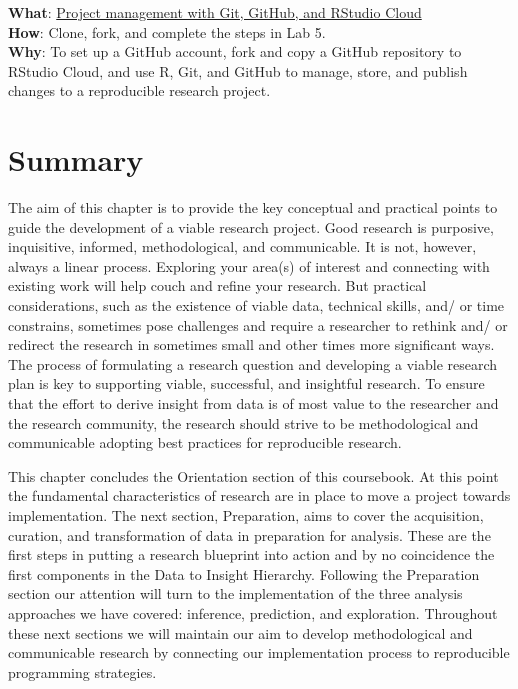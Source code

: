 \documentclass[
  letterpaper,
]{latex/krantz}
\begin{document}
\begin{tcolorbox}[enhanced jigsaw, opacitybacktitle=0.6, breakable, colframe=quarto-callout-tip-color-frame, arc=.35mm, left=2mm, leftrule=.75mm, title=\textcolor{quarto-callout-tip-color}{\faLightbulb}\hspace{0.5em}{Lab}, opacityback=0, colback=white, toptitle=1mm, rightrule=.15mm, titlerule=0mm, bottomtitle=1mm, bottomrule=.15mm, coltitle=black, colbacktitle=quarto-callout-tip-color!10!white, toprule=.15mm]
\textbf{What}: \href{https://github.com/lin380/lab_5}{Project management
with Git, GitHub, and RStudio Cloud}\\
\textbf{How}: Clone, fork, and complete the steps in Lab 5.\\
\textbf{Why}: To set up a GitHub account, fork and copy a GitHub
repository to RStudio Cloud, and use R, Git, and GitHub to manage,
store, and publish changes to a reproducible research project.
\end{tcolorbox}

\hypertarget{summary-4}{%
\section*{Summary}\label{summary-4}}

The aim of this chapter is to provide the key conceptual and practical
points to guide the development of a viable research project. Good
research is purposive, inquisitive, informed, methodological, and
communicable. It is not, however, always a linear process. Exploring
your area(s) of interest and connecting with existing work will help
couch and refine your research. But practical considerations, such as
the existence of viable data, technical skills, and/ or time constrains,
sometimes pose challenges and require a researcher to rethink and/ or
redirect the research in sometimes small and other times more
significant ways. The process of formulating a research question and
developing a viable research plan is key to supporting viable,
successful, and insightful research. To ensure that the effort to derive
insight from data is of most value to the researcher and the research
community, the research should strive to be methodological and
communicable adopting best practices for reproducible research.

This chapter concludes the Orientation section of this coursebook. At
this point the fundamental characteristics of research are in place to
move a project towards implementation. The next section, Preparation,
aims to cover the acquisition, curation, and transformation of data in
preparation for analysis. These are the first steps in putting a
research blueprint into action and by no coincidence the first
components in the Data to Insight Hierarchy. Following the Preparation
section our attention will turn to the implementation of the three
analysis approaches we have covered: inference, prediction, and
exploration. Throughout these next sections we will maintain our aim to
develop methodological and communicable research by connecting our
implementation process to reproducible programming strategies.
\end{document}
